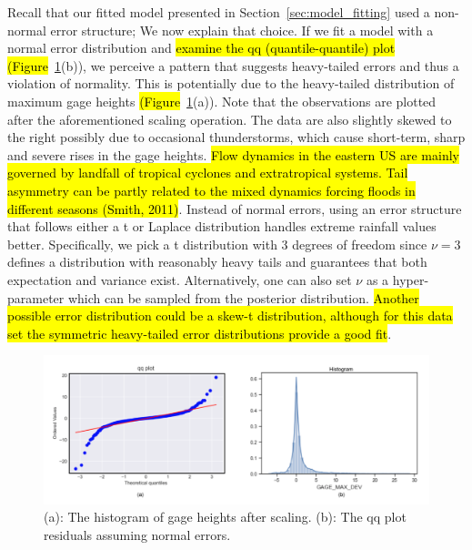 Recall that our fitted model presented in Section~\ref{sec:model_fitting} used a non-normal error structure;
We now explain that choice.
If we fit a model with a normal error distribution and \hl{examine the qq (quantile-quantile) plot (Figure}~\ref{fig:hist_original}(b)), we perceive  a pattern that suggests heavy-tailed errors and thus a violation of normality.
This is potentially due to the heavy-tailed distribution of maximum gage heights \hl{(Figure}~\ref{fig:hist_original}(a)).
Note that the observations are plotted after the aforementioned scaling operation.
The data are also slightly skewed to the right possibly due to occasional thunderstorms, which cause short-term, sharp and severe rises in the gage heights.
\hl{Flow dynamics in the eastern US are mainly governed by landfall of tropical cyclones and extratropical systems.
Tail asymmetry can be partly related to the mixed dynamics forcing floods in different seasons (Smith, 2011)}.
Instead of normal errors, using an error structure that follows either a t or Laplace distribution handles extreme rainfall values better.
Specifically, we pick a t distribution with 3 degrees of freedom since $ \nu =3$ defines a distribution with reasonably heavy tails and  guarantees that both expectation and variance exist.
Alternatively, one can also set $\nu$ as a hyper-parameter which can be sampled from the posterior distribution.
\hl{Another possible error distribution could be a skew-t distribution, although for this data set the symmetric heavy-tailed error distributions provide a good fit}. \\

\begin{figure}[htbp]
 \begin{center}
     \includegraphics[width=\textwidth]{../images/qq_and_hist_gage_height_after_scaling.png}
\caption{(a): The histogram of gage heights after scaling. (b): The qq plot residuals assuming normal errors.}
\label{fig:hist_original}
 \end{center}
\end{figure}

